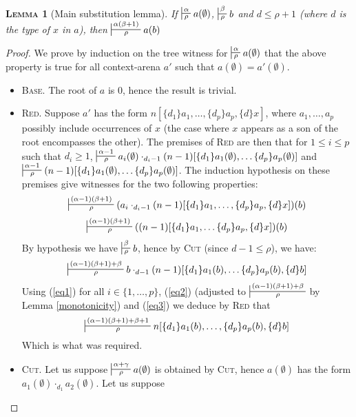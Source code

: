 \documentclass{article}
\newtheorem{lemma}{\textsc{Lemma}}
\begin{document}
\begin{lemma}[Main substitution lemma]
If $\sststile{\rho}{\alpha} a(\emptyset)$, $\sststile{\rho}{\beta} b$ and $d \leq \rho + 1$ (where $d$ is the type of $x$ in $a$), then $\sststile{\rho}{\alpha(\beta+1)} a(b)$
\label{main_substitution}
\end{lemma}
\begin{proof}
We prove by induction on the tree witness for $\sststile{\rho}{\alpha} a(\emptyset)$ that the above property is true for all context-arena $a'$ such that $a(\emptyset) = a'(\emptyset)$.
\begin{itemize}
\item \textsc{Base.} The root of $a$ is $0$, hence the result is trivial.
\item \textsc{Red.} Suppose $a'$ has the form $n[\{d_1\}a_1, \dots, \{d_p\}a_p, \{d\}x]$, where $a_1, \dots, a_p$ possibly include occurrences of $x$ (the case where $x$ appears as a son
of the root encompasses the other). The premises of \textsc{Red} are then that for $1 \leq i \leq p$ such that
$d_i\geq 1$, $\sststile{\rho}{\alpha-1} a_i(\emptyset) \cdot_{d_i-1} (n-1)[\{d_1\}a_1(\emptyset), \dots \{d_p\}a_p(\emptyset)]$
and $\sststile{\rho}{\alpha-1} (n-1)[\{d_1\}a_1(\emptyset), \dots \{d_p\}a_p(\emptyset)]$. The induction hypothesis on these premises give witnesses for the two following properties:
\begin{eqnarray}
\sststile{\rho}{(\alpha-1)(\beta+1)} (a_i \cdot_{d_i-1} (n-1)[\{d_1\}a_1, \dots, \{d_p\}a_p, \{d\}x])(b)\label{eq1}
\end{eqnarray}
\begin{eqnarray}
\sststile{\rho}{(\alpha-1)(\beta+1)} ((n-1)[\{d_1\}a_1, \dots \{d_p\}a_p, \{d\}x])(b)\label{eq2}
\end{eqnarray}
By hypothesis we have $\sststile{\rho}{\beta} b$, hence by \textsc{Cut} (since $d-1\leq \rho$), we have:
\begin{eqnarray}
\sststile{\rho}{(\alpha-1)(\beta+1) + \beta} b \cdot_{d-1} (n-1)[\{d_1\}a_1(b), \dots \{d_p\}a_p(b), \{d\}b]\label{eq3}
\end{eqnarray}
Using (\ref{eq1}) for all $i\in \{1, \dots, p\}$, (\ref{eq2}) (adjusted to $\sststile{\rho}{(\alpha-1)(\beta+1)+\beta}$ by Lemma \ref{monotonicity}) and (\ref{eq3}) we deduce by \textsc{Red} that
\[
\sststile{\rho}{(\alpha-1)(\beta+1)+ \beta + 1} n[\{d_1\}a_1(b), \dots, \{d_p\}a_p(b), \{d\}b]
\]
Which is what was required.
\item \textsc{Cut.} Let us suppose $\sststile{\rho}{\alpha+\gamma} a(\emptyset)$ is obtained by \textsc{Cut}, hence $a(\emptyset)$ has the form $a_1(\emptyset) \cdot_{d_1} a_2(\emptyset)$. Let us suppose

\end{itemize}
\end{proof}
\end{document}
